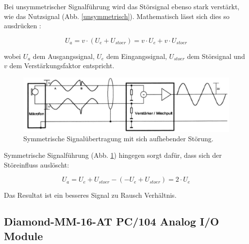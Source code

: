 \documentclass[12pt,a4paper,twoside,BCOR=12.5mm]{scrartcl}
\begin{document}
Bei unsymmetrischer Signalführung wird das Störsignal ebenso stark verstärkt, wie das Nutzsignal (Abb. \ref{unsymmetrisch}). Mathematisch lässt sich dies so ausdrücken \citep{Sengpiel:2001fk}:

\begin{equation}
U_a = v \cdot (U_e + U_{stoer}) = v \cdot U_e + v \cdot U_{stoer}
\end{equation}

wobei $U_a$ dem Ausgangssignal, $U_e$ dem Eingangssignal, $U_{stoer}$ dem Störsignal und $v$ dem Verstärkungsfaktor entspricht.

\begin{figure}[H]
\centering
\includegraphics[scale=.9]{symmetrisch.png}
\caption{Symmetrische Signalübertragung mit sich aufhebender Störung. \citep{Sengpiel:2001fk}}
\label{symmetrisch}
\end{figure}

Symmetrische Signalführung (Abb. \ref{symmetrisch}) hingegen sorgt dafür, dass sich der Stör\-einfluss auslöscht:

\begin{equation}
U_a = U_e + U_{stoer} - ( -U_e + U_{stoer} ) = 2 \cdot U_e
\end{equation}

Das Resultat ist ein besseres Signal zu Rausch Verhältnis.


\subsection{Diamond-MM-16-AT PC/104 Analog I/O Module}
\end{document}
